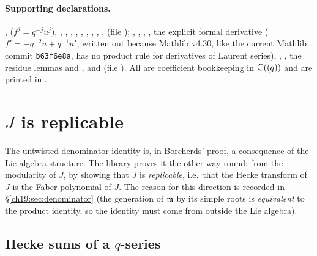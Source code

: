 \paragraph{Supporting declarations.}  , 
($f^j=q^{-j}u^j$), , , ,
, , , ,
, , 
(file ); , ,
, , the explicit formal derivative
 ($f'=-q^{-2}u+q^{-1}u'$, written out because Mathlib v4.30, like the current Mathlib commit \texttt{b63f6e8a}, has no product rule
for derivatives of Laurent series), , , the residue
lemmas  and , and
 (file ).  All are coefficient
bookkeeping in ${\mathbb{C}}((q))$ and are printed in .

\section{\texorpdfstring{$J$}{J} is replicable}\label{ch19:sec:Jrep}

The untwisted denominator identity is, in Borcherds' proof, a consequence of the Lie algebra structure.  The library
proves it the other way round: from the modularity of $J$, by showing that $J$ is \emph{replicable}, i.e.\ that the
Hecke transform of $J$ is the Faber polynomial of $J$.  The reason for this direction is recorded in
\S\ref{ch19:sec:denominator} (the generation of $\mathfrak{m}$ by its simple roots is \emph{equivalent} to the product
identity, so the identity must come from outside the Lie algebra).

\subsection{Hecke sums of a \texorpdfstring{$q$}{q}-series}

